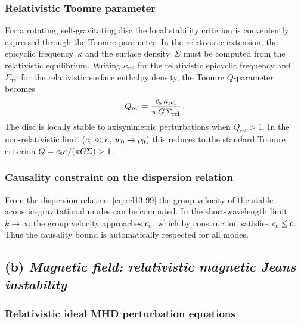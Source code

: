 \subsubsection*{Relativistic Toomre parameter}

For a rotating, self-gravitating disc the local stability criterion is
conveniently expressed through the Toomre parameter.  In the
relativistic extension, the epicyclic frequency~$\kappa$ and the
surface density~$\Sigma$ must be computed from the relativistic
equilibrium.  Writing $\kappa_{\mathrm{rel}}$ for the relativistic
epicyclic frequency and $\Sigma_{\mathrm{rel}}$ for the relativistic
surface enthalpy density, the Toomre $Q$-parameter becomes
\begin{equation}
  Q_{\mathrm{rel}}
  = \frac{\cs\,\kappa_{\mathrm{rel}}}%
         {\pi\,G\,\Sigma_{\mathrm{rel}}}\,.
  \label{eq:rel13-Qrel}
\end{equation}
The disc is locally stable to axisymmetric perturbations when
$Q_{\mathrm{rel}} > 1$.  In the non-relativistic limit
($c_{\mathrm{s}} \ll c$, $w_{0}\to\rho_{0}$) this reduces to the
standard Toomre criterion $Q = c_{\mathrm{s}}\kappa/(\pi G\Sigma) > 1$.

\subsubsection*{Causality constraint on the dispersion relation}

From the dispersion relation~\eqref{eq:rel13-99} the group velocity of
the stable acoustic--gravitational modes can be computed.  In the
short-wavelength limit $k\to\infty$ the group velocity approaches
$c_{\mathrm{s}}$, which by construction satisfies $c_{\mathrm{s}} \le c$.  Thus the
causality bound is automatically respected for all modes.

\subsection*{(b) \textit{Magnetic field: relativistic magnetic Jeans
  instability}}
\label{subsec:rel-120b}

\subsubsection*{Relativistic ideal MHD perturbation equations}


